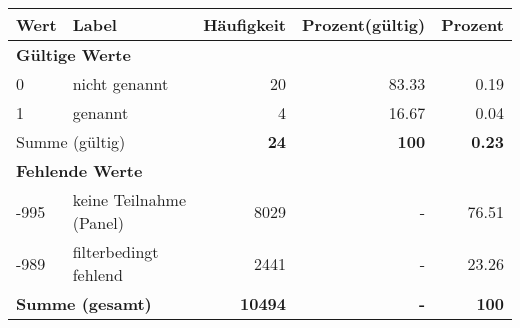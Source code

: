      \begin{longtable}{lXrrr}
     \toprule
     \textbf{Wert} & \textbf{Label} & \textbf{Häufigkeit} & \textbf{Prozent(gültig)} & \textbf{Prozent} \\
     \endhead
     \midrule
     \multicolumn{5}{l}{\textbf{Gültige Werte}}\\

     0 &
     \multicolumn{1}{X}{ nicht genannt   } &


       \num{20} &
       \num[round-mode=places,round-precision=2]{83.33} &
         \num[round-mode=places,round-precision=2]{0.19} \\

     1 &
     \multicolumn{1}{X}{ genannt   } &


       \num{4} &
       \num[round-mode=places,round-precision=2]{16.67} &
         \num[round-mode=places,round-precision=2]{0.04} \\
     \midrule
     \multicolumn{2}{l}{Summe (gültig)} &
       \textbf{\num{24}} &
     \textbf{\num{100}} &
       \textbf{\num[round-mode=places,round-precision=2]{0.23}} \\
     \multicolumn{5}{l}{\textbf{Fehlende Werte}}\\
       -995 &
       keine Teilnahme (Panel) &
         \num{8029} &
        - &
         \num[round-mode=places,round-precision=2]{76.51} \\
       -989 &
       filterbedingt fehlend &
         \num{2441} &
        - &
         \num[round-mode=places,round-precision=2]{23.26} \\
     \midrule
     \multicolumn{2}{l}{\textbf{Summe (gesamt)}} &
          \textbf{\num{10494}} &
        \textbf{-} &
        \textbf{\num{100}} \\
     \bottomrule
     \end{longtable}
     
